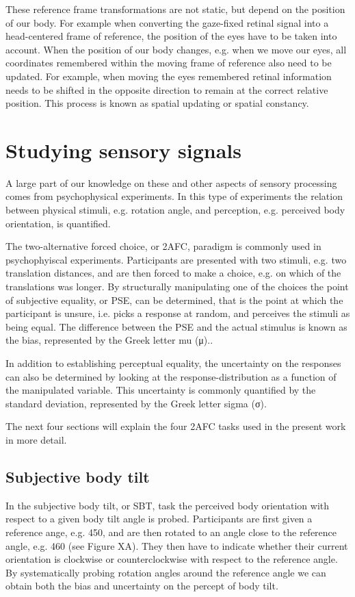 These reference frame transformations are not static, but depend on the position of our body. For example when converting the gaze-fixed retinal signal into a head-centered frame of reference, the position of the eyes have to be taken into account. When the position of our body changes, e.g. when we move our eyes, all coordinates remembered within the moving frame of reference also need to be updated. For example, when moving the eyes remembered retinal information needs to be shifted in the opposite direction to remain at the correct relative position. This process is known as spatial updating or spatial constancy.

\section{Studying sensory signals}
A large part of  our knowledge on these and other aspects of sensory processing comes from psychophysical experiments. In this type of experiments the relation between physical stimuli, e.g. rotation angle, and perception, e.g. perceived body orientation, is quantified.

The two-alternative forced choice, or 2AFC, paradigm is commonly used in psychophyiscal experiments. Participants are presented with two stimuli, e.g. two translation distances, and are then forced to make a choice, e.g. on which of the translations was longer. By structurally manipulating one of the choices the point of subjective equality, or PSE, can be determined, that is the point at which the participant is unsure, i.e. picks a response at random, and perceives the stimuli as being equal. The difference between the PSE and the actual stimulus is known as the bias, represented by the Greek letter mu (μ)..

In addition to establishing perceptual equality, the uncertainty on the responses can also be determined by looking at the response-distribution as a function of the manipulated variable. This uncertainty is commonly quantified by the standard deviation, represented by the Greek letter sigma (σ).

The next four sections will explain the four 2AFC tasks used in the present work in more detail.

\subsection{Subjective body tilt}
In the subjective body tilt, or SBT, task the perceived body orientation with respect to a given body tilt angle is probed. Participants are first given a reference ange, e.g. 450, and are then rotated to an angle close to the reference angle, e.g. 460 (see Figure XA). They then have to indicate whether their current orientation is clockwise or counterclockwise with respect to the reference angle. By systematically probing rotation angles around the reference angle we can obtain both the bias and uncertainty on the percept of body tilt.

